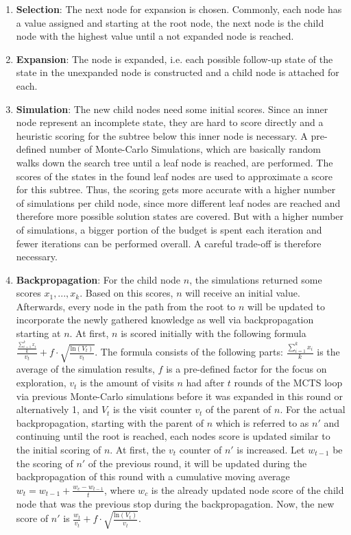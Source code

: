 \begin{enumerate}
    \item \textbf{Selection}: The next node for expansion is chosen.
    Commonly, each node has a value assigned and starting at the root node, the next node is the child node with the highest value until a not expanded node is reached.
    \item \textbf{Expansion}: The node is expanded, i.e. each possible follow-up state of the state in the unexpanded node is constructed and a child node is attached for each.
    \item \textbf{Simulation}: The new child nodes need some initial scores.
    Since an inner node represent an incomplete state, they are hard to score directly and a heuristic scoring for the subtree below this inner node is necessary.
    A pre-defined number of Monte-Carlo Simulations, which are basically random walks down the search tree until a leaf node is reached, are performed.
    The scores of the states in the found leaf nodes are used to approximate a score for this subtree.
    Thus, the scoring gets more accurate with a higher number of simulations per child node, since more different leaf nodes are reached and therefore more possible solution states are covered.
    But with a higher number of simulations, a bigger portion of the budget is spent each iteration and fewer iterations can be performed overall.
    A careful trade-off is therefore necessary.
    \item \textbf{Backpropagation}: For the child node $n$, the simulations returned some scores $x_1, ..., x_k$.
    Based on this scores, $n$ will receive an initial value.
    Afterwards, every node in the path from the root to $n$ will be updated to incorporate the newly gathered knowledge as well via backpropagation starting at $n$.
    At first, $n$ is scored initially with the following formula $\frac{\frac{\sum_{i=1}^k x_i}{k}}{v_t} + f \cdot \sqrt{\frac{\mathrm{ln} (V_t)}{v_t}}$.
    The formula consists of the following parts: $\frac{\sum_{i=1}^k x_i}{k}$ is the average of the simulation results, $f$ is a pre-defined factor for the focus on exploration, $v_t$ is the amount of visits $n$ had after $t$ rounds of the MCTS loop via previous Monte-Carlo simulations before it was expanded in this round or alternatively 1, and $V_t$ is the visit counter $v_t$ of the parent of $n$.
    For the actual backpropagation, starting with the parent of $n$ which is referred to as $n'$ and continuing until the root is reached, each nodes score is updated similar to the initial scoring of $n$.
    At first, the $v_t$ counter of $n'$ is increased.
    Let $w_{t-1}$ be the scoring of $n'$ of the previous round, it will be updated during the backpropagation of this round with a cumulative moving average $w_t=w_{t-1} + \frac{w_c - w_{t-1}}{t}$, where $w_c$ is the already updated node score of the child node that was the previous stop during the backpropagation.
    Now, the new score of $n'$ is $\frac{w_t}{v_t} + f \cdot \sqrt{\frac{\mathrm{ln} (V_t)}{v_t}}$.
\end{enumerate}
